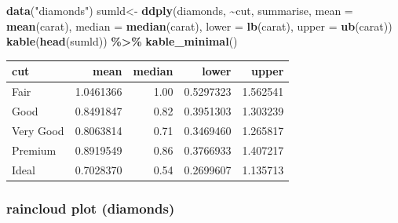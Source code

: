 \documentclass[
]{article}
\newenvironment{Shaded}{\begin{snugshade}}{\end{snugshade}}
\newcommand{\AttributeTok}[1]{\textcolor[rgb]{0.13,0.29,0.53}{#1}}
\newcommand{\FunctionTok}[1]{\textcolor[rgb]{0.13,0.29,0.53}{\textbf{#1}}}
\newcommand{\NormalTok}[1]{#1}
\newcommand{\OtherTok}[1]{\textcolor[rgb]{0.56,0.35,0.01}{#1}}
\newcommand{\SpecialCharTok}[1]{\textcolor[rgb]{0.81,0.36,0.00}{\textbf{#1}}}
\newcommand{\StringTok}[1]{\textcolor[rgb]{0.31,0.60,0.02}{#1}}
\begin{document}
\begin{Shaded}
\begin{Highlighting}[]
\FunctionTok{data}\NormalTok{(}\StringTok{"diamonds"}\NormalTok{)}
\NormalTok{sumld}\OtherTok{\textless{}{-}} \FunctionTok{ddply}\NormalTok{(diamonds, }\SpecialCharTok{\textasciitilde{}}\NormalTok{cut, summarise, }\AttributeTok{mean =} \FunctionTok{mean}\NormalTok{(carat), }\AttributeTok{median =} \FunctionTok{median}\NormalTok{(carat), }
              \AttributeTok{lower =} \FunctionTok{lb}\NormalTok{(carat), }\AttributeTok{upper =} \FunctionTok{ub}\NormalTok{(carat))}
\FunctionTok{kable}\NormalTok{(}\FunctionTok{head}\NormalTok{(sumld)) }\SpecialCharTok{\%\textgreater{}\%} \FunctionTok{kable\_minimal}\NormalTok{()}
\end{Highlighting}
\end{Shaded}

\begin{table}
\centering
\begin{tabular}{l|r|r|r|r}
\hline
cut & mean & median & lower & upper\\
\hline
Fair & 1.0461366 & 1.00 & 0.5297323 & 1.562541\\
\hline
Good & 0.8491847 & 0.82 & 0.3951303 & 1.303239\\
\hline
Very Good & 0.8063814 & 0.71 & 0.3469460 & 1.265817\\
\hline
Premium & 0.8919549 & 0.86 & 0.3766933 & 1.407217\\
\hline
Ideal & 0.7028370 & 0.54 & 0.2699607 & 1.135713\\
\hline
\end{tabular}
\end{table}

\hypertarget{raincloud-plot-diamonds}{%
\subsubsection{raincloud plot (diamonds)}\label{raincloud-plot-diamonds}}
\end{document}

